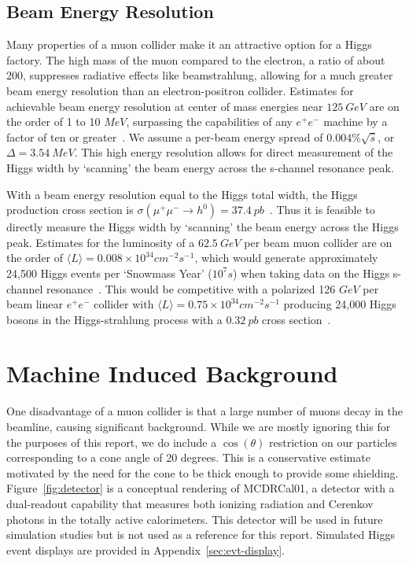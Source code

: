 \documentclass[a4paper]{article}
\begin{document}
	\subsection{Beam Energy Resolution}
	Many properties of a muon collider make it an attractive option for a Higgs factory. The high mass of the muon compared to the electron, a ratio of about 200, suppresses radiative effects like beamstrahlung, allowing for a much greater beam energy resolution than an electron-positron collider. Estimates for achievable beam energy resolution at center of mass energies near $125~GeV$ are on the order of 1 to 10 $MeV$, surpassing the capabilities of any $e^+e^-$ machine by a factor of ten or greater~\cite{map-palmer}. We assume a per-beam energy spread of $0.004\%\sqrt{\hat{s}}$, or $\Delta = 3.54~MeV$. This high energy resolution allows for direct measurement of the Higgs width by `scanning' the beam energy across the s-channel resonance peak. 

	With a beam energy resolution equal to the Higgs total width, the Higgs production cross section is $\sigma (\mu^+\mu^-\rightarrow h^0) = 37.4~pb$~\cite{mc-physics-eich}. Thus it is feasible to directly measure the Higgs width by `scanning' the beam energy across the Higgs peak. Estimates for the luminosity of a $62.5~GeV$ per beam muon collider are on the order of $\langle L \rangle = 0.008\times 10^{34} cm^{-2}s^{-1}$, which would generate approximately 24,500 Higgs events per `Snowmass Year' ($10^7s$) when taking data on the Higgs s-channel resonance~\cite{map-whitepaper}. This would be competitive with a polarized 126 $GeV$ per beam linear $e^+e^-$ collider with $\langle L \rangle = 0.75\times 10^{34} cm^{-2}s^{-1}$ producing 24,000 Higgs bosons in the Higgs-strahlung process with a $0.32~pb$ cross section~\cite{map-palmer,ilc-tdr}.%

\section{Machine Induced Background}
One disadvantage of a muon collider is that a large number of muons decay in the beamline, causing significant background. While we are mostly ignoring this for the purposes of this report, we do include a $\cos(\theta)$ restriction on our particles corresponding to a cone angle of 20 degrees. This is a conservative estimate motivated by the need for the cone to be thick enough to provide some shielding. Figure~\ref{fig:detector} is a conceptual rendering of MCDRCal01, a detector with a dual-readout capability that measures both ionizing radiation and Cerenkov photons in the totally active calorimeters. This detector will be used in future simulation studies but is not used as a reference for this report. Simulated Higgs event displays are provided in Appendix~\ref{sec:evt-display}.
\end{document}
